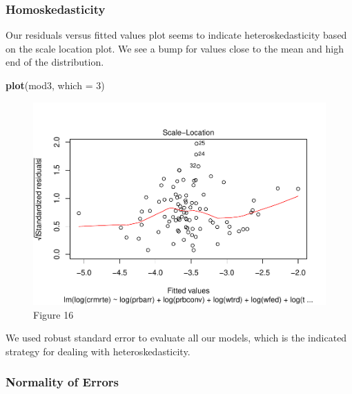 \documentclass[]{article}
\newenvironment{Shaded}{\begin{snugshade}}{\end{snugshade}}
\newcommand{\DataTypeTok}[1]{\textcolor[rgb]{0.13,0.29,0.53}{#1}}
\newcommand{\DecValTok}[1]{\textcolor[rgb]{0.00,0.00,0.81}{#1}}
\newcommand{\KeywordTok}[1]{\textcolor[rgb]{0.13,0.29,0.53}{\textbf{#1}}}
\newcommand{\NormalTok}[1]{#1}
\begin{document}
\hypertarget{homoskedasticity}{%
\subsubsection{Homoskedasticity}\label{homoskedasticity}}

Our residuals versus fitted values plot seems to indicate
heteroskedasticity based on the scale location plot. We see a bump for
values close to the mean and high end of the distribution.

\begin{Shaded}
\begin{Highlighting}[]
\KeywordTok{plot}\NormalTok{(mod3, }\DataTypeTok{which =} \DecValTok{3}\NormalTok{)}
\end{Highlighting}
\end{Shaded}

\begin{figure}

{\centering \includegraphics{lab_3_final_files/figure-latex/unnamed-chunk-48-1} 

}

\caption{Figure 16}\label{fig:unnamed-chunk-48}
\end{figure}

We used robust standard error to evaluate all our models, which is the
indicated strategy for dealing with heteroskedasticity.

\hypertarget{normality-of-errors}{%
\subsubsection{Normality of Errors}\label{normality-of-errors}}
\end{document}
